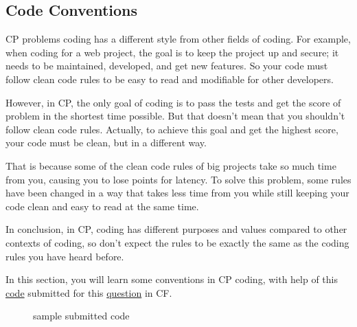 \documentclass[12pt, a4paper]{article}
\begin{document}
\subsection{Code Conventions}
CP problems coding has a different style from other fields of coding. For example, when coding for a web project, the goal is to keep the project up and secure; it needs to be maintained, developed, and get new features. So your code must follow clean code rules to be easy to read and modifiable for other developers.

However, in CP, the only goal of coding is to pass the tests and get the score of problem in the shortest time possible. But that doesn't mean that you shouldn't follow clean code rules. Actually, to achieve this goal and get the highest score, your code must be clean, but in a different way.

That is because some of the clean code rules of big projects take so much time from you, causing you to lose points for latency. To solve this problem, some rules have been changed in a way that takes less time from you while still keeping your code clean and easy to read at the same time.

In conclusion, in CP, coding has different purposes and values compared to other contexts of coding, so don't expect the rules to be exactly the same as the coding rules you have heard before.

In this section, you will learn some conventions in CP coding, with help of this \href{https://codeforces.com/contest/1767/submission/185533520}{code} submitted for this \href{https://codeforces.com/contest/1767/problem/B}{question} in CF.

\begin{figure}[H]
\caption{sample submitted code}
\end{figure}
\end{document}
